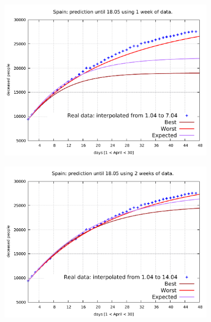 \documentclass[8pt]{article}
\begin{document}
\begin{figure}[h!]
  \centering
  \begin{subfigure}[b]{0.45\linewidth}
  \includegraphics[width=\linewidth]{../simulations/sp/1-7/1-7.pdf}
  \end{subfigure}
  \begin{subfigure}[b]{0.45\linewidth}
    \includegraphics[width=\linewidth]{../simulations/sp/1-14/1-14.pdf}
  \end{subfigure}
  \begin{subfigure}[b]{0.45\linewidth}

\end{subfigure}
\end{figure}
\end{document}

